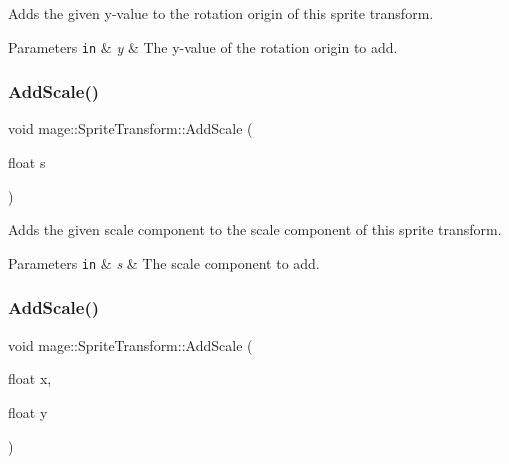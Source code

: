 Adds the given y-\/value to the rotation origin of this sprite transform.


\begin{DoxyParams}[1]{Parameters}
\mbox{\tt in}  & {\em y} & The y-\/value of the rotation origin to add. \\
\hline
\end{DoxyParams}
\hypertarget{structmage_1_1_sprite_transform_ad1246a7488bf8cea0df893f9c78022ab}{}\label{structmage_1_1_sprite_transform_ad1246a7488bf8cea0df893f9c78022ab} 
\subsubsection{\texorpdfstring{Add\+Scale()}{AddScale()}\hspace{0.1cm}{\footnotesize\ttfamily [1/4]}}
{\footnotesize\ttfamily void mage\+::\+Sprite\+Transform\+::\+Add\+Scale (\begin{DoxyParamCaption}\item[{float}]{s }\end{DoxyParamCaption})\hspace{0.3cm}{\ttfamily [noexcept]}}

Adds the given scale component to the scale component of this sprite transform.


\begin{DoxyParams}[1]{Parameters}
\mbox{\tt in}  & {\em s} & The scale component to add. \\
\hline
\end{DoxyParams}
\hypertarget{structmage_1_1_sprite_transform_a8cefcfcef4032250c006c07fa2110d48}{}\label{structmage_1_1_sprite_transform_a8cefcfcef4032250c006c07fa2110d48} 
\subsubsection{\texorpdfstring{Add\+Scale()}{AddScale()}\hspace{0.1cm}{\footnotesize\ttfamily [2/4]}}
{\footnotesize\ttfamily void mage\+::\+Sprite\+Transform\+::\+Add\+Scale (\begin{DoxyParamCaption}\item[{float}]{x,  }\item[{float}]{y }\end{DoxyParamCaption})\hspace{0.3cm}{\ttfamily [noexcept]}}

